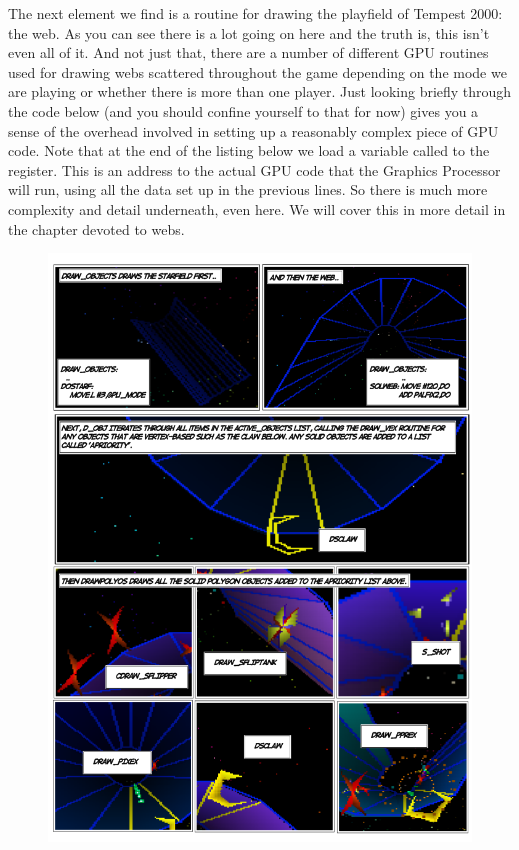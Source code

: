 The next element we find is a routine for drawing the playfield of Tempest 2000: the web. As you can
see there is a lot going on here and the truth is, this isn't even all of it. And not just that,
there are a number of different GPU routines used for drawing webs scattered throughout the game depending
on the mode we are playing or whether there is more than one player. Just looking briefly through the code
below (and you should confine yourself to that for now) gives you a sense of the overhead involved in setting
up a reasonably complex piece of GPU code. Note that at the end of the listing below we load a variable called
 to the  register. This is an address to the actual GPU code that the Graphics Processor
will run, using all the data set up in the previous lines. So there is much more complexity and detail underneath,
even here. We will cover this in more detail in the chapter devoted to webs.

\begin{figure}[H]
      \centering
      \includegraphics[width=13.7cm]{src/mainloop/mainloop-draw_objects-comic.png}%
\end{figure}

